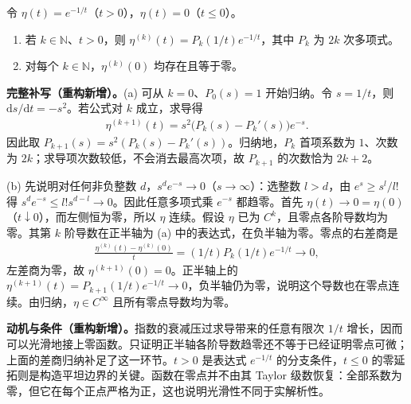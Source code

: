 \documentclass[../../main.tex]{subfiles}
\begin{document}
\begin{exercise}\label{exercise:ch08-flat-function}
令 $\eta(t)=e^{-1/t}$（$t>0$），$\eta(t)=0$（$t\leqslant0$）。
\begin{enumerate}
\item\label{item:ch08-flat-a}若 $k\in\mathbb N$、$t>0$，则 $\eta^{(k)}(t)=P_k(1/t)e^{-1/t}$，其中 $P_k$ 为 $2k$ 次多项式。
\item\label{item:ch08-flat-b}对每个 $k\in\mathbb N$，$\eta^{(k)}(0)$ 均存在且等于零。
\end{enumerate}
\end{exercise}
\begin{solution}
\textbf{完整补写（重构新增）。}(a) 可从 $k=0$、$P_0(s)=1$ 开始归纳。令 $s=1/t$，则 $\mathrm ds/\mathrm dt=-s^2$。若公式对 $k$ 成立，求导得
\begin{align*}
\eta^{(k+1)}(t)=s^2\bigl(P_k(s)-P_k'(s)\bigr)e^{-s}.
\end{align*}
因此取 $P_{k+1}(s)=s^2(P_k(s)-P_k'(s))$。归纳地，$P_k$ 首项系数为 $1$、次数为 $2k$；求导项次数较低，不会消去最高次项，故 $P_{k+1}$ 的次数恰为 $2k+2$。

(b) 先说明对任何非负整数 $d$，$s^de^{-s}\to0$（$s\to\infty$）：选整数 $l>d$，由 $e^s\geqslant s^l/l!$ 得 $s^de^{-s}\leqslant l!s^{d-l}\to0$。因此任意多项式乘 $e^{-s}$ 都趋零。首先 $\eta(t)\to0=\eta(0)$（$t\downarrow0$），而左侧恒为零，所以 $\eta$ 连续。假设 $\eta$ 已为 $C^k$，且零点各阶导数均为零。其第 $k$ 阶导数在正半轴为 (a) 中的表达式，在负半轴为零。零点的右差商是
\begin{align*}
\frac{\eta^{(k)}(t)-\eta^{(k)}(0)}{t}
=(1/t)P_k(1/t)e^{-1/t}\longrightarrow0,
\end{align*}
左差商为零，故 $\eta^{(k+1)}(0)=0$。正半轴上的 $\eta^{(k+1)}(t)=P_{k+1}(1/t)e^{-1/t}\to0$，负半轴仍为零，说明这个导数也在零点连续。由归纳，$\eta\in C^\infty$ 且所有零点导数均为零。
\end{solution}
\begin{remark}
\textbf{动机与条件（重构新增）。}指数的衰减压过求导带来的任意有限次 $1/t$ 增长，因而可以光滑地接上零函数。只证明正半轴各阶导数趋零还不等于已经证明零点可微；上面的差商归纳补足了这一环节。$t>0$ 是表达式 $e^{-1/t}$ 的分支条件，$t\leqslant0$ 的零延拓则是构造平坦边界的关键。函数在零点并不由其 Taylor 级数恢复：全部系数为零，但它在每个正点严格为正，这也说明光滑性不同于实解析性。
\end{remark}
\end{document}
